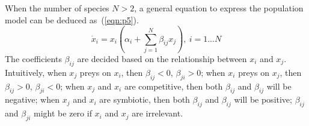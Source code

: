 When the number of species $N>2$, a general equation to express the population model can be deduced as~(\ref{eqn:p5}).
\begin{equation}\label{eqn:p5}
   \dot{x}_i = x_i(\alpha_i+ \sum_{j=1}^{N} \beta_{ij}x_j), ~i=1...N
\end{equation}
The coefficients $\beta_{ij}$ are decided based on the relationship between $x_i$ and $x_j$. Intuitively, when $x_j$ preys on $x_i$, then $\beta_{ij}<0$, $\beta_{ji}>0$; when $x_i$ preys on $x_j$, then $\beta_{ij}>0$, $\beta_{ji}<0$; when $x_j$ and $x_i$ are competitive, then both $\beta_{ij}$ and $\beta_{ij}$ will be negative; when $x_j$ and $x_i$ are symbiotic, then both $\beta_{ij}$ and $\beta_{ij}$ will be positive; $\beta_{ij}$ and $\beta_{ji}$ might be zero if $x_i$ and $x_j$ are irrelevant. 